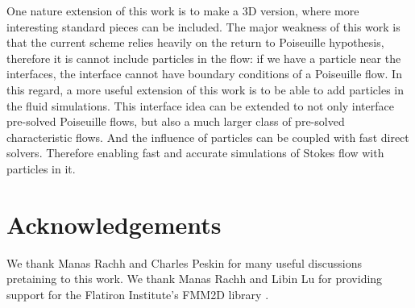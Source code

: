 \documentclass[10pt,twocolumn,letterpaper]{article}
\begin{document}
One nature extension of this work is to make a 3D version, 
where more interesting standard pieces can be included.
The major weakness of this work is that the current scheme relies heavily 
on the return to Poiseuille hypothesis, therefore it is cannot
include particles in the flow: 
if we have a particle near the interfaces, the interface cannot have
boundary conditions of a Poiseuille flow. 
In this regard, a more useful extension of this work is to be able to add particles in the fluid simulations. 
This interface idea can be extended to not only interface pre-solved Poiseuille flows, 
but also a much larger class of pre-solved characteristic flows. 
And the influence of particles can be coupled with fast direct solvers.
Therefore enabling fast and accurate simulations of Stokes flow with particles in it. 

\section*{Acknowledgements\label{sec:acknowledgements}}

We thank Manas Rachh and Charles Peskin for many useful discussions pretaining to this work. 
We thank Manas Rachh and Libin Lu for providing support for the Flatiron Institute's FMM2D library \cite{FlatironinstituteFmm2d2022}.



\end{document}
